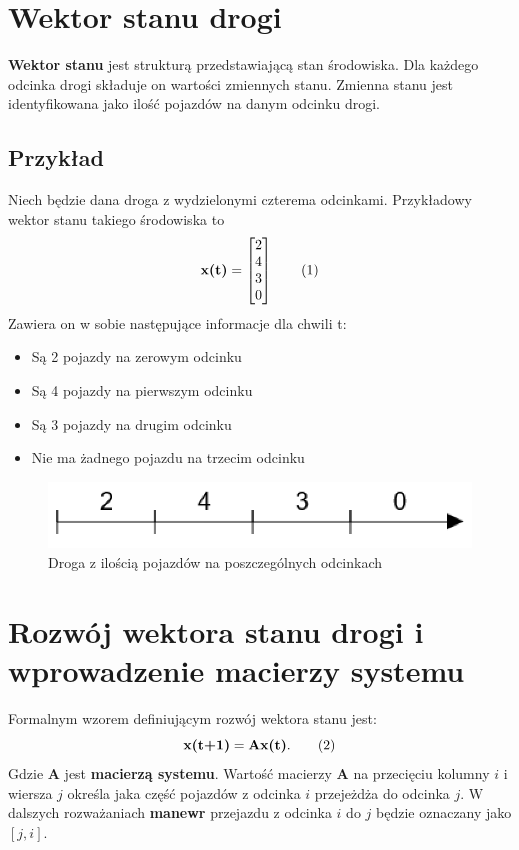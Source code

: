 \documentclass[12pt]{book}
\theoremstyle{plain}
\newcommand\addtag{\refstepcounter{equation}
\renewcommand{\labelenumii}{\theenumii}
\renewcommand{\theenumii}{\theenumi.\arabic{enumii}.}
\tag{\theequation}}
\newcommand{\myref}[1]{(\ref{#1})}
\begin{document}
\section{Wektor stanu drogi} \label{sec:wektor_stanu_drogi}
\textbf{Wektor stanu} jest strukturą przedstawiającą stan środowiska. Dla każdego odcinka drogi składuje on wartości zmiennych stanu. Zmienna stanu jest identyfikowana jako ilość pojazdów na danym odcinku drogi. 
\subsection*{Przykład} \label{subsec:example-single-road}
Niech będzie dana droga z wydzielonymi czterema odcinkami. Przykładowy wektor stanu takiego środowiska to
\[\textbf{x(t)}=\begin{bmatrix}
2 \\ 4 \\ 3 \\ 0
\end{bmatrix} \addtag \]
Zawiera on w sobie następujące informacje dla chwili t:
\begin{itemize}
	\item Są 2 pojazdy na zerowym odcinku
	\item Są 4 pojazdy na pierwszym odcinku
	\item Są 3 pojazdy na drugim odcinku
	\item Nie ma żadnego pojazdu na trzecim odcinku
\end{itemize}

\begin{figure}[H]
	\centering
	\includegraphics[width=14cm]{images/1_droga_4_odcinki}
	\caption{Droga z ilością pojazdów na poszczególnych odcinkach}
	\label{fig:single_road}
\end{figure}
\section{Rozwój wektora stanu drogi i wprowadzenie macierzy systemu} \label{sec:macierz_systemu_def}
Formalnym wzorem definiującym rozwój wektora stanu jest:
\[\textbf{x(t+1)}=\textbf{Ax(t)}. \addtag \label{eq:single_road} \]
Gdzie $\textbf{A}$ jest \textbf{macierzą systemu}. Wartość macierzy $\textbf{A}$ na przecięciu kolumny $i$ i wiersza $j$  określa jaka część pojazdów z odcinka $i$ przejeżdża do odcinka $j$. W dalszych rozważaniach \textbf{manewr} przejazdu z odcinka $i$ do $j$ będzie oznaczany jako $[j,i]$.
\end{document}
